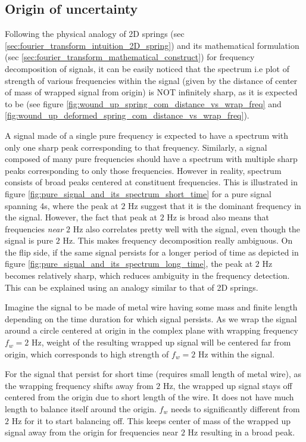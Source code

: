 \documentclass[11pt, a4paper]{article}
\begin{document}
	\subsection{Origin of uncertainty}\label{sec:fourier_transform_intuitive_origin_of_uncertainty}
	Following the physical analogy of 2D springs (sec \ref{sec:fourier_transform_intuition_2D_spring}) and its mathematical formulation (sec \ref{sec:fourier_transform_mathematical_construct}) for frequency decomposition of signals, it can be easily noticed that the spectrum i.e plot of strength of various frequencies within the signal (given by the distance of center of mass of wrapped signal from origin) is NOT infinitely sharp, as it is expected to be (see figure \ref{fig:wound_up_spring_com_distance_vs_wrap_freq} and \ref{fig:wound_up_deformed_spring_com_distance_vs_wrap_freq}). 
	
	A signal made of a single pure frequency is expected to have a spectrum with only one sharp peak corresponding to that frequency. Similarly, a signal composed of many pure frequencies should have a spectrum with multiple sharp peaks corresponding to only those frequencies. However in reality, spectrum consists of broad peaks centered at constituent frequencies. This is illustrated in figure \ref{fig:pure_signal_and_its_spectrum_short_time} for a pure signal spanning 4s, where the peak at $2$ Hz suggest that it is the dominant frequency in the signal. However, the fact that peak at $2$ Hz is broad also means that frequencies \textit{near} $2$ Hz also correlates pretty well with the signal, even though the signal is pure $2$ Hz. This makes frequency decomposition really ambiguous. On the flip side, if the same signal persists for a longer period of time as depicted in figure \ref{fig:pure_signal_and_its_spectrum_long_time}, the peak at $2$ Hz becomes relatively sharp, which reduces ambiguity in the frequency detection. This can be explained using an analogy similar to that of 2D springs.
	
	Imagine the signal to be made of metal wire having some mass and finite length depending on the time duration for which signal persists. As we wrap the signal around a circle centered at origin in the complex plane with wrapping frequency $f_{w} = 2$ Hz, weight of the resulting wrapped up signal will be centered far from origin, which corresponds to high strength of $f_{w} = 2$ Hz within the signal.
	
	For the signal that persist for short time (requires small length of metal wire), as the wrapping frequency shifts away from $2$ Hz, the wrapped up signal stays off centered from the origin due to short length of the wire. It does not have much length to balance itself around the origin. $f_{w}$ needs to significantly different from $2$ Hz for it to start balancing off. This keeps center of mass of the wrapped up signal away from the origin for frequencies near $2$ Hz resulting in a broad peak. 
	
\end{document}
